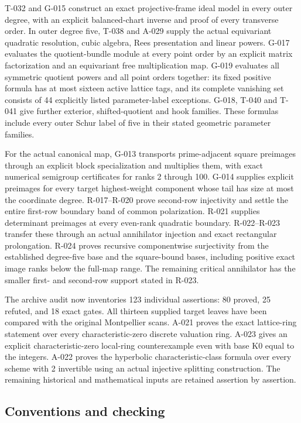 \documentclass[
  10pt,
]{article}
\begin{document}
T-032 and G-015 construct an exact projective-frame ideal model in every
outer degree, with an explicit balanced-chart inverse and proof of every
transverse order. In outer degree five, T-038 and A-029 supply the
actual equivariant quadratic resolution, cubic algebra, Rees
presentation and linear powers. G-017 evaluates the quotient-bundle
module at every point order by an explicit matrix factorization and an
equivariant free multiplication map. G-019 evaluates all symmetric
quotient powers and all point orders together: its fixed positive
formula has at most sixteen active lattice tags, and its complete
vanishing set consists of 44 explicitly listed parameter-label
exceptions. G-018, T-040 and T-041 give further exterior,
shifted-quotient and hook families. These formulas include every outer
Schur label of five in their stated geometric parameter families.

For the actual canonical map, G-013 transports prime-adjacent square
preimages through an explicit block specialization and multiplies them,
with exact numerical semigroup certificates for ranks 2 through 100.
G-014 supplies explicit preimages for every target highest-weight
component whose tail has size at most the coordinate degree.
R-017--R-020 prove second-row injectivity and settle the entire
first-row boundary band of common polarization. R-021 supplies
determinant preimages at every even-rank quadratic boundary.
R-022--R-023 transfer these through an actual annihilator injection and
exact rectangular prolongation. R-024 proves recursive componentwise
surjectivity from the established degree-five base and the square-bound
bases, including positive exact image ranks below the full-map range.
The remaining critical annihilator has the smaller first- and second-row
support stated in R-023.

The archive audit now inventories 123 individual assertions: 80 proved,
25 refuted, and 18 exact gates. All thirteen supplied target leaves have
been compared with the original Montpellier scans. A-021 proves the
exact lattice-ring statement over every characteristic-zero discrete
valuation ring. A-023 gives an explicit characteristic-zero local-ring
counterexample even with base K0 equal to the integers. A-022 proves the
hyperbolic characteristic-class formula over every scheme with 2
invertible using an actual injective splitting construction. The
remaining historical and mathematical inputs are retained assertion by
assertion.

\subsection{Conventions and checking}\label{conventions-and-checking}
\end{document}
